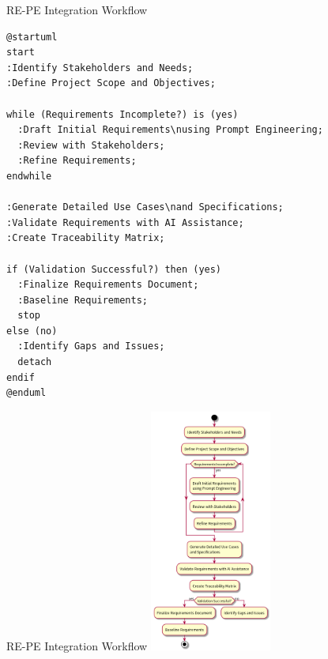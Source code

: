 \documentclass{beamer}
\begin{document}
\begin{frame}[fragile]{RE-PE Integration Workflow}
    \lstset{style=plantuml}
    \begin{lstlisting}[caption={Requirements Engineering Workflow}]
@startuml
start
:Identify Stakeholders and Needs;
:Define Project Scope and Objectives;

while (Requirements Incomplete?) is (yes)
  :Draft Initial Requirements\nusing Prompt Engineering;
  :Review with Stakeholders;
  :Refine Requirements;
endwhile

:Generate Detailed Use Cases\nand Specifications;
:Validate Requirements with AI Assistance;
:Create Traceability Matrix;

if (Validation Successful?) then (yes)
  :Finalize Requirements Document;
  :Baseline Requirements;
  stop
else (no)
  :Identify Gaps and Issues;
  detach
endif
@enduml
    \end{lstlisting}
\end{frame}

\begin{frame}[fragile]{RE-PE Integration Workflow}
    \centering
    \includegraphics[width=0.3\textwidth]{images/re-pe.png} %
\end{frame}
\end{document}
